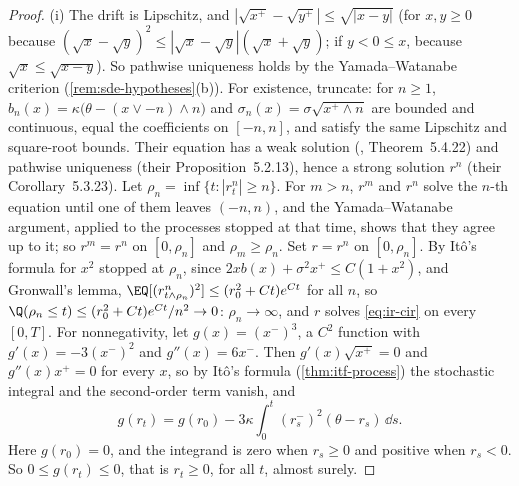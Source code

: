 \begin{proof}
(i) The drift is Lipschitz, and $|\sqrt{x^+}-\sqrt{y^+}|\le\sqrt{|x-y|}$ (for $x,y\ge0$ because
$(\sqrt x-\sqrt y)^2\le|\sqrt x-\sqrt y|(\sqrt x+\sqrt y)$; if $y<0\le x$, because $\sqrt x\le\sqrt{x-y}$).
So pathwise uniqueness holds by the Yamada--Watanabe criterion (\cref{rem:sde-hypotheses}(b)). For
existence, truncate: for $n\ge1$, $b_n(x)=\kappa\big(\theta-(x\vee-n)\wedge n\big)$ and
$\sigma_n(x)=\sigma\sqrt{x^+\wedge n}$ are bounded and continuous, equal the coefficients on $[-n,n]$, and
satisfy the same Lipschitz and square-root bounds. Their equation has a weak solution
(\textcite{karatzas-shreve}, Theorem~5.4.22) and pathwise uniqueness (their Proposition~5.2.13),
hence a strong solution $r^n$ (their Corollary~5.3.23). Let $\rho_n=\inf\{t:|r^n_t|\ge n\}$. For $m>n$,
$r^m$ and $r^n$ solve the $n$-th equation until one of them leaves $(-n,n)$, and the
Yamada--Watanabe argument, applied to the processes stopped at that time, shows that they agree
up to it; so $r^m=r^n$ on $[0,\rho_n]$ and $\rho_m\ge\rho_n$. Set $r=r^n$ on $[0,\rho_n]$. By It\^o's
formula for $x^2$ stopped at $\rho_n$, since $2xb(x)+\sigma^2x^+\le C(1+x^2)$, and Gronwall's lemma,
$\EQ[(r^n_{t\wedge\rho_n})^2]\le(r_0^2+Ct)e^{Ct}$ for all $n$, so $\Q(\rho_n\le t)\le(r_0^2+Ct)e^{Ct}/n^2\to0$:
$\rho_n\to\infty$, and $r$ solves \eqref{eq:ir-cir} on every $[0,T]$. For nonnegativity, let $g(x)=(x^-)^3$, a $C^2$ function with $g'(x)=-3(x^-)^2$ and
$g''(x)=6x^-$. Then $g'(x)\sqrt{x^+}=0$ and $g''(x)x^+=0$ for every $x$, so by It\^o's formula
(\cref{thm:itf-process}) the stochastic integral and the second-order term vanish, and
\[
  g(r_t)=g(r_0)-3\kappa\int_0^t(r_s^-)^2(\theta-r_s)\,\dd s .
\]
Here $g(r_0)=0$, and the integrand is zero when $r_s\ge0$ and positive when $r_s<0$. So
$0\le g(r_t)\le0$, that is $r_t\ge0$, for all $t$, almost surely.


\end{proof}
